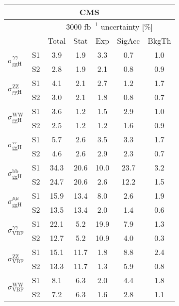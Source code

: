 \begin{tabular}{@{} l c c@{\hskip 0.15in} c c c c @{}}
 \hline
 \multicolumn{7}{c}{CMS}\\
 \hline
  &  & \multicolumn{5}{c}{3000 $\text{fb}^{-1}$ uncertainty [\%]} \\
  &  & Total & Stat & Exp & SigAcc & BkgTh \\
 \hline
\multirow{2}{*}{$\sigma_{\mathrm{ggH}}^{\gamma \gamma }$} & S1  & 3.9& 1.9 & 3.3 & 0.7 & 1.0  \\[1pt]
                        & S2  & 2.8& 1.9 & 2.1 & 0.8 & 0.9  \\[4pt]
\multirow{2}{*}{$\sigma_{\mathrm{ggH}}^{\mathrm{ZZ}}$} & S1  & 4.1& 2.1 & 2.7 & 1.2 & 1.7  \\[1pt]
                        & S2  & 3.0& 2.1 & 1.8 & 0.8 & 0.7  \\[4pt]
\multirow{2}{*}{$\sigma_{\mathrm{ggH}}^{\mathrm{WW}}$} & S1  & 3.6& 1.2 & 1.5 & 2.9 & 1.0  \\[1pt]
                        & S2  & 2.5& 1.2 & 1.2 & 1.6 & 0.9  \\[4pt]
\multirow{2}{*}{$\sigma_{\mathrm{ggH}}^{\tau \tau }$} & S1  & 5.7& 2.6 & 3.5 & 3.3 & 1.7  \\[1pt]
                        & S2  & 4.6& 2.6 & 2.9 & 2.3 & 0.7  \\[4pt]
\multirow{2}{*}{$\sigma_{\mathrm{ggH}}^{\mathrm{bb}}$} & S1  & 34.3& 20.6 & 10.0 & 23.7 & 3.2  \\[1pt]
                        & S2  & 24.7& 20.6 & 2.6 & 12.2 & 1.5  \\[4pt]
\multirow{2}{*}{$\sigma_{\mathrm{ggH}}^{\mu \mu }$} & S1  & 15.9& 13.4 & 8.0 & 2.6 & 1.9  \\[1pt]
                        & S2  & 13.5& 13.4 & 2.0 & 1.4 & 0.6  \\[4pt]
\multirow{2}{*}{$\sigma_{\mathrm{VBF}}^{\gamma \gamma }$} & S1  & 22.1& 5.2 & 19.9 & 7.9 & 1.3  \\[1pt]
                        & S2  & 12.7& 5.2 & 10.9 & 4.0 & 0.3  \\[4pt]
\multirow{2}{*}{$\sigma_{\mathrm{VBF}}^{\mathrm{ZZ}}$} & S1  & 15.1& 11.7 & 1.8 & 8.8 & 2.4  \\[1pt]
                        & S2  & 13.3& 11.7 & 1.3 & 5.9 & 0.8  \\[4pt]
\multirow{2}{*}{$\sigma_{\mathrm{VBF}}^{\mathrm{WW}}$} & S1  & 8.1& 6.3 & 2.0 & 4.4 & 1.8  \\[1pt]
                        & S2  & 7.2& 6.3 & 1.6 & 2.8 & 1.1  \\[4pt]

\end{tabular}
